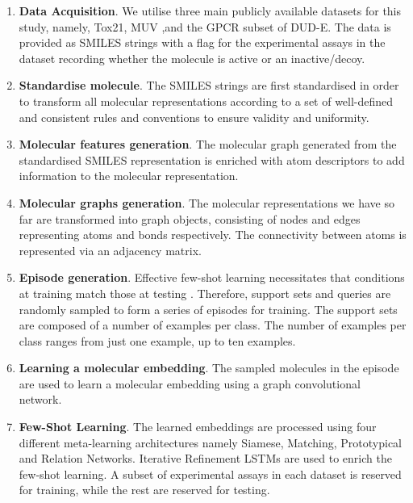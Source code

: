\begin{enumerate}
	\item \textbf{Data Acquisition}. We utilise three main publicly available datasets for this study, namely, Tox21, MUV ,and the GPCR subset of DUD-E. The data is provided as SMILES strings with a flag for the experimental assays in the dataset recording whether the molecule is active or an inactive/decoy.

	\item \textbf{Standardise molecule}. The SMILES strings are first standardised in order to transform all molecular representations according to a set of well-defined and consistent rules and conventions to ensure validity and uniformity.

	\item \textbf{Molecular features generation}. The molecular graph generated from the standardised SMILES representation is enriched with atom descriptors to add information to the molecular representation.

	\item \textbf{Molecular graphs generation}. The molecular representations we have so far are transformed into graph objects, consisting of nodes and edges representing atoms and bonds respectively. The connectivity between atoms is represented via an adjacency matrix.

	\item \textbf{Episode generation}. Effective few-shot learning necessitates that conditions at training match those at testing \citep{vinyals2016matching}. Therefore, support sets and queries are randomly sampled to form a series of episodes for training. The support sets are composed of a number of examples per class. The number of examples per class ranges from just one example, up to ten examples.

	\item \textbf{Learning a molecular embedding}. The sampled molecules in the episode are used to learn a molecular embedding using a graph convolutional network.

	\item \textbf{Few-Shot Learning}. The learned embeddings are processed using four different meta-learning architectures namely Siamese, Matching, Prototypical and Relation Networks. Iterative Refinement LSTMs \citep{altae2017low} are used to enrich the few-shot learning. A subset of experimental assays in each dataset is reserved for training, while the rest are reserved for testing.


\end{enumerate}
